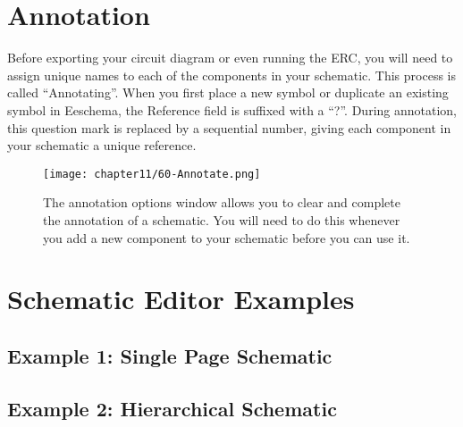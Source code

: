 \section{Annotation}

Before exporting your circuit diagram or even running the ERC, you will need to assign unique names to each of the components in your schematic.
This process is called ``Annotating''.
When you first place a new symbol or duplicate an existing symbol in Eeschema, the Reference field is suffixed with a ``?''.
During annotation, this question mark is replaced by a sequential number, giving each component in your schematic a unique reference.

\begin{figure}
	\texttt{[image: chapter11/60-Annotate.png]}
	\caption[Annotation Options Window]{The annotation options window allows you to clear and complete the annotation of a schematic.  You will need to do this whenever you add a new component to your schematic before you can use it.}
	\label{fig:annotate}
\end{figure}



\section{Schematic Editor Examples}
\subsection{Example 1: Single Page Schematic}
\subsection{Example 2: Hierarchical Schematic}